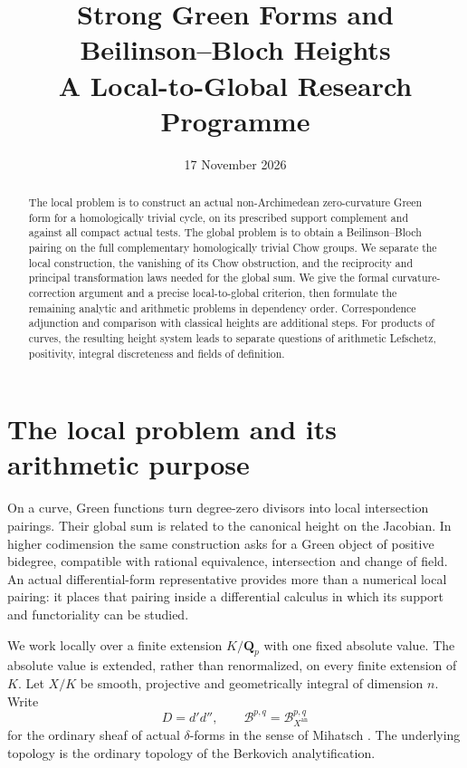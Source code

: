 \documentclass[11pt]{article}
\title{Strong Green Forms and Beilinson--Bloch Heights\\A Local-to-Global Research Programme}
\author{}
\date{17 November 2026}
\theoremstyle{definition}
\numberwithin{equation}{section}
\newcommand{\an}{\mathrm{an}}
\newcommand{\B}{\mathcal B}
\newcommand{\Q}{\mathbf Q}
\begin{document}
\maketitle
\begin{abstract}
The local problem is to construct an actual non-Archimedean zero-curvature Green form for a homologically trivial cycle, on its prescribed support complement and against all compact actual tests. The global problem is to obtain a Beilinson--Bloch pairing on the full complementary homologically trivial Chow groups. We separate the local construction, the vanishing of its Chow obstruction, and the reciprocity and principal transformation laws needed for the global sum. We give the formal curvature-correction argument and a precise local-to-global criterion, then formulate the remaining analytic and arithmetic problems in dependency order. Correspondence adjunction and comparison with classical heights are additional steps. For products of curves, the resulting height system leads to separate questions of arithmetic Lefschetz, positivity, integral discreteness and fields of definition.
\end{abstract}

\tableofcontents

\section{The local problem and its arithmetic purpose}\label{sec:purpose}

On a curve, Green functions turn degree-zero divisors into local intersection pairings. Their global sum is related to the canonical height on the Jacobian. In higher codimension the same construction asks for a Green object of positive bidegree, compatible with rational equivalence, intersection and change of field. An actual differential-form representative provides more than a numerical local pairing: it places that pairing inside a differential calculus in which its support and functoriality can be studied.

We work locally over a finite extension $K/\Q_p$ with one fixed absolute value. The absolute value is extended, rather than renormalized, on every finite extension of $K$. Let $X/K$ be smooth, projective and geometrically integral of dimension $n$. Write
\[
 D=d'd'',\qquad \B^{p,q}=\B^{p,q}_{X^{\an}}
\]
for the ordinary sheaf of actual $\delta$-forms in the sense of Mihatsch \cite{M}. The underlying topology is the ordinary topology of the Berkovich analytification.
\end{document}
